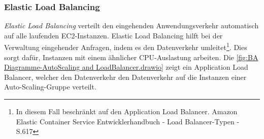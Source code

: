 \subsubsection*{Elastic Load Balancing}%
\textit{Elastic Load Balancing} verteilt den eingehenden Anwendungsverkehr automatisch auf alle laufenden EC2-Instanzen. Elastic Load Balancing hilft bei der Verwaltung eingehender Anfragen, indem es den Datenverkehr umleitet\footnote{In diesem Fall beschränkt auf den Application Load Balancer. Amazon Elastic Container Service Entwicklerhandbuch - Load Balancer-Typen - S.617\cite{AMZ39}}. Dies sorgt dafür, Instanzen mit einem ähnlicher CPU-Auslastung arbeiten. Die \autoref{fig:BA Diagramme-AutoScaling and LoadBalancer.drawio} zeigt ein Application Load Balancer, welcher den Datenverkehr den Datenverkehr auf die Instanzen einer Auto-Scaling-Gruppe verteilt.


